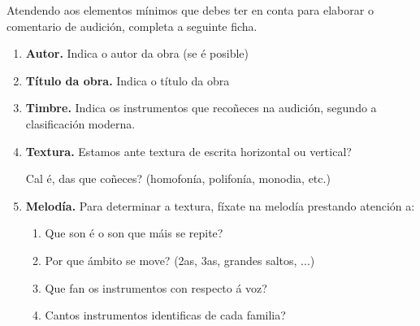 

%
\begin{ejercicio}
%
Atendendo aos elementos mínimos que debes ter en conta para elaborar o comentario de audición, completa a seguinte ficha.
%
    \begin{enumerate}[1.-]
    \item \textbf{Autor.} Indica o autor da obra (se é posible) \dotfill
    \item \textbf{Título da obra.} Indica o título da obra \dotfill
        \item 
        \textbf{Timbre.}
        Indica os instrumentos que recoñeces na audición, segundo a clasificación moderna.
        \vspace*{1.0cm}
%
        \item
        \textbf{Textura.}
        Estamos ante textura de escrita horizontal ou vertical? \dotfill
        \par
        Cal é, das que coñeces? (homofonía, polifonía, monodia, etc.) \dotfill \par
%
        \item
        \textbf{Melodía.}
            Para determinar a textura, fíxate na melodía prestando atención a:
            \begin{enumerate}
            \item Que son é o son que máis se repite? \dotfill
            \item Por que ámbito se move? (2as, 3as, grandes saltos, ...) \dotfill
            \item Que fan os instrumentos con respecto á voz? \dotfill
            \item Cantos instrumentos identificas de cada familia? \dotfill

\end{enumerate}
\end{enumerate}
\end{ejercicio}

